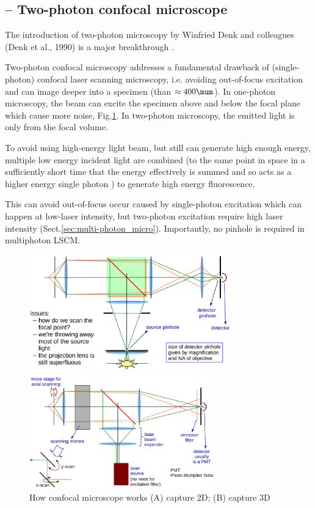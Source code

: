 \subsection{-- Two-photon confocal microscope}
\label{sec:two-photon-confocal-imaging}

The introduction of two-photon microscopy by Winfried Denk and colleagues (Denk
et al., 1990) is a major breakthrough \citep{denk1990}.

Two-photon confocal microscopy addresses a fundamental drawback of
(single-photon) confocal laser scanning microscopy, i.e. avoiding out-of-focus
excitation and can image deeper into a specimen (than $\approx 400 \mum$).
In one-photon microscopy, the beam can excite the specimen above and below the
focal plane which cause more noise, Fig.\ref{fig:confocal_micro}. In two-photon
microscopy, the emitted light is only from the focal volume.

To avoid using high-energy light beam, but still can generate high enough
energy, multiple low energy incident light are combined (to the same point in
space in a sufficiently short time that the energy effectively is summed and so
acts as a higher energy single photon \citep{semwogerere2005}) to generate high
energy fluorescence.

This can avoid out-of-focus occur caused by single-photon excitation which can
happen at low-laser intensity, but two-photon excitation require high laser
intensity (Sect.\ref{sec:multi-photon_micro}).
Importantly, no pinhole is required in multiphoton LSCM.




\begin{figure}[hbt]
  \centerline{\includegraphics[height=5cm,
    angle=0]{./images/confocal_microscope3.eps}}
    \centerline{\includegraphics[height=5cm,
    angle=0]{./images/confocal_microscope4.eps}}
  \caption{How confocal microscope works (A) capture 2D; (B) capture 3D}
  \label{fig:confocal_micro}
\end{figure}

